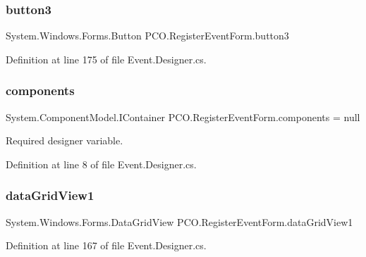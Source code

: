 \subsubsection{\texorpdfstring{button3}{button3}}
{\footnotesize\ttfamily System.\+Windows.\+Forms.\+Button P\+C\+O.\+Register\+Event\+Form.\+button3\hspace{0.3cm}{\ttfamily [private]}}



Definition at line 175 of file Event.\+Designer.\+cs.

\mbox{\label{classPCO_1_1RegisterEventForm_a8f1ca27e2a7a4f9ade18a13d56998a0b}} 
\subsubsection{\texorpdfstring{components}{components}}
{\footnotesize\ttfamily System.\+Component\+Model.\+I\+Container P\+C\+O.\+Register\+Event\+Form.\+components = null\hspace{0.3cm}{\ttfamily [private]}}



Required designer variable. 



Definition at line 8 of file Event.\+Designer.\+cs.

\mbox{\label{classPCO_1_1RegisterEventForm_a2be47e5a60fb5506df1307807366c8ca}} 
\subsubsection{\texorpdfstring{data\+Grid\+View1}{dataGridView1}}
{\footnotesize\ttfamily System.\+Windows.\+Forms.\+Data\+Grid\+View P\+C\+O.\+Register\+Event\+Form.\+data\+Grid\+View1\hspace{0.3cm}{\ttfamily [private]}}



Definition at line 167 of file Event.\+Designer.\+cs.


